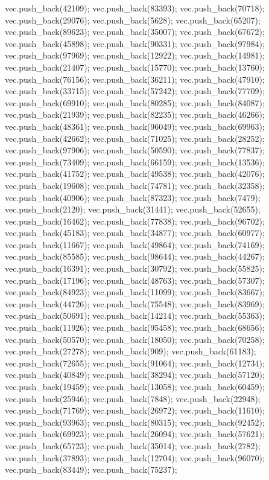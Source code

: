 vec.push_back(42109);
vec.push_back(83393);
vec.push_back(70718);
vec.push_back(29076);
vec.push_back(5628);
vec.push_back(65207);
vec.push_back(89623);
vec.push_back(35007);
vec.push_back(67672);
vec.push_back(45898);
vec.push_back(90331);
vec.push_back(97984);
vec.push_back(97969);
vec.push_back(12922);
vec.push_back(14981);
vec.push_back(21407);
vec.push_back(15770);
vec.push_back(13760);
vec.push_back(76156);
vec.push_back(36211);
vec.push_back(47910);
vec.push_back(33715);
vec.push_back(57242);
vec.push_back(77709);
vec.push_back(69910);
vec.push_back(80285);
vec.push_back(84087);
vec.push_back(21939);
vec.push_back(82235);
vec.push_back(46266);
vec.push_back(48361);
vec.push_back(96049);
vec.push_back(69963);
vec.push_back(42662);
vec.push_back(71025);
vec.push_back(28252);
vec.push_back(97906);
vec.push_back(50590);
vec.push_back(77837);
vec.push_back(73409);
vec.push_back(66159);
vec.push_back(13536);
vec.push_back(41752);
vec.push_back(49538);
vec.push_back(42076);
vec.push_back(19608);
vec.push_back(74781);
vec.push_back(32358);
vec.push_back(40906);
vec.push_back(87323);
vec.push_back(7479);
vec.push_back(2120);
vec.push_back(31441);
vec.push_back(52655);
vec.push_back(16462);
vec.push_back(77838);
vec.push_back(96702);
vec.push_back(45183);
vec.push_back(34877);
vec.push_back(60977);
vec.push_back(11667);
vec.push_back(49864);
vec.push_back(74169);
vec.push_back(85585);
vec.push_back(98644);
vec.push_back(44267);
vec.push_back(16391);
vec.push_back(30792);
vec.push_back(55825);
vec.push_back(17196);
vec.push_back(48763);
vec.push_back(57307);
vec.push_back(84923);
vec.push_back(11099);
vec.push_back(83667);
vec.push_back(44726);
vec.push_back(75548);
vec.push_back(83969);
vec.push_back(50691);
vec.push_back(14214);
vec.push_back(55363);
vec.push_back(11926);
vec.push_back(95458);
vec.push_back(68656);
vec.push_back(50570);
vec.push_back(18050);
vec.push_back(70258);
vec.push_back(27278);
vec.push_back(909);
vec.push_back(61183);
vec.push_back(72655);
vec.push_back(91064);
vec.push_back(12734);
vec.push_back(40849);
vec.push_back(38294);
vec.push_back(57120);
vec.push_back(19459);
vec.push_back(13058);
vec.push_back(60459);
vec.push_back(25946);
vec.push_back(7848);
vec.push_back(22948);
vec.push_back(71769);
vec.push_back(26972);
vec.push_back(11610);
vec.push_back(93963);
vec.push_back(80315);
vec.push_back(92452);
vec.push_back(69923);
vec.push_back(26094);
vec.push_back(57621);
vec.push_back(65723);
vec.push_back(35014);
vec.push_back(2782);
vec.push_back(37893);
vec.push_back(12704);
vec.push_back(96070);
vec.push_back(83449);
vec.push_back(75237);
